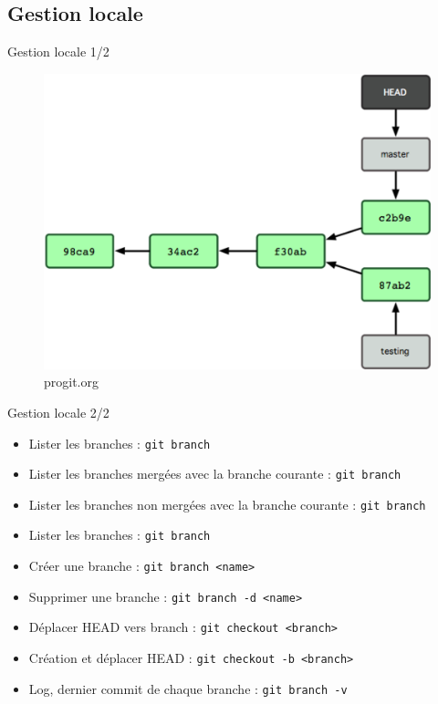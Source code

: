 \documentclass{beamer}
\begin{document}
\subsection*{Gestion locale}
\begin{frame}{Gestion locale 1/2}
  \begin{figure}
    \begin{center}
      \includegraphics[scale=0.7]{img/Branch1.png}
    \end{center}
    \caption{progit.org}
  \end{figure}
\end{frame}

\begin{frame}[containsverbatim]{Gestion locale 2/2}
  \begin{itemize}
  \item Lister les branches : \lstinline|git branch|  
  \item Lister les branches mergées avec la branche courante : \lstinline|git branch|
  \item Lister les branches non mergées avec la branche courante : \lstinline|git branch|  
  \item Lister les branches : \lstinline|git branch|  
  \item Créer une branche : \lstinline|git branch <name>|
  \item Supprimer une branche : \lstinline|git branch -d <name>|
  \item Déplacer HEAD vers branch : \lstinline|git checkout <branch>|
  \item Création et déplacer HEAD : \lstinline|git checkout -b <branch>|
  \item Log, dernier commit de chaque branche : \lstinline|git branch -v|
  \end{itemize}
\end{frame}
\end{document}
